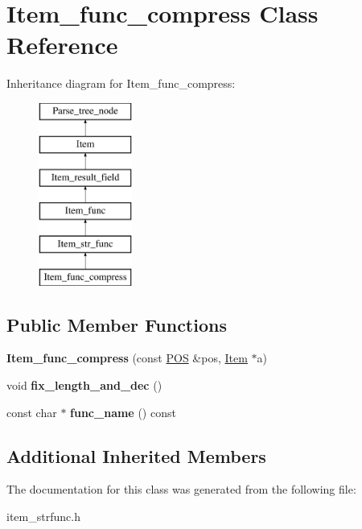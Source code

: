 \hypertarget{classItem__func__compress}{}\section{Item\+\_\+func\+\_\+compress Class Reference}
\label{classItem__func__compress}
Inheritance diagram for Item\+\_\+func\+\_\+compress\+:\begin{figure}[H]
\begin{center}
\leavevmode
\includegraphics[height=6.000000cm]{classItem__func__compress}
\end{center}
\end{figure}
\subsection*{Public Member Functions}
\begin{DoxyCompactItemize}
\item 
\mbox{\label{classItem__func__compress_a5627656826698bee28d7f68580cd3706}} 
{\bfseries Item\+\_\+func\+\_\+compress} (const \mbox{\hyperlink{structYYLTYPE}{P\+OS}} \&pos, \mbox{\hyperlink{classItem}{Item}} $\ast$a)
\item 
\mbox{\label{classItem__func__compress_a55fd204b27a7e1b8644be6e63da06d87}} 
void {\bfseries fix\+\_\+length\+\_\+and\+\_\+dec} ()
\item 
\mbox{\label{classItem__func__compress_a39162b233672c1f23c875c101f13ec6d}} 
const char $\ast$ {\bfseries func\+\_\+name} () const
\end{DoxyCompactItemize}
\subsection*{Additional Inherited Members}


The documentation for this class was generated from the following file\+:\begin{DoxyCompactItemize}
\item 
item\+\_\+strfunc.\+h\end{DoxyCompactItemize}
